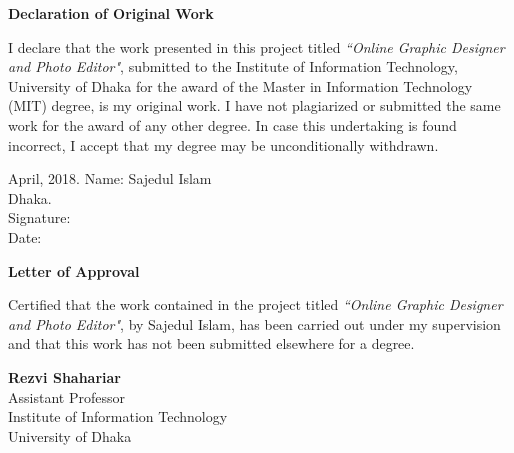 \documentclass[12pt,a4 paper]{report}
\begin{document}
\newpage
\pagestyle{plain}
 \vspace*{2cm}
\begin{center}
\begin{LARGE}
\textbf{Declaration of Original Work \\} 
\end{LARGE}
\end{center}
I declare that the work presented in this project titled \textit{``Online Graphic Designer and Photo Editor"}, submitted to the Institute of Information Technology, University of Dhaka for the award of the Master in Information Technology (MIT) degree, is my original work. I have not plagiarized or submitted the same work for the award of any other degree. In case this undertaking is found incorrect, I accept that my degree may be unconditionally withdrawn.

\vspace*{3cm}
 
\noindent April, 2018.  \hspace*{7.4cm} \noindent Name: Sajedul Islam \\

\noindent Dhaka. \\  \hspace*{9.7cm} \noindent Signature: \\

 \hspace*{9.1cm} \noindent Date: \\
 

\newpage
\pagestyle{plain}
 \vspace*{2.5cm}
\begin{center}
\begin{LARGE}
\textbf{Letter of Approval \\} 
\end{LARGE}
\end{center}
Certified that the work contained in the project titled \textit{``Online Graphic Designer and Photo Editor"}, by Sajedul Islam, has been carried out under my supervision and that this work has not been submitted elsewhere for a degree.

 \vspace*{6cm}
 \noindent \textbf{Rezvi Shahariar} \\
 \noindent Assistant Professor \\
 \noindent Institute of Information Technology \\
 \noindent University of Dhaka \\
\end{document}
